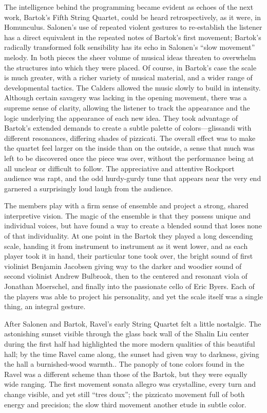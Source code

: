 The intelligence behind the programming became evident as echoes of the next work, Bartok’s Fifth String Quartet, could be heard retrospectively, as it were, in Homunculus. Salonen’s use of repeated violent gestures to re-establish the listener has a direct equivalent in the repeated notes of Bartok’s first movement; Bartok’s radically transformed folk sensibility has its echo in Salonen’s “slow movement” melody. In both pieces the sheer volume of musical ideas threaten to overwhelm the structures into which they were placed. Of course, in Bartok’s case the scale is much greater, with a richer variety of musical material, and a wider range of developmental tactics. The Calders allowed the music slowly to build in intensity. Although certain savagery was lacking in the opening movement, there was a supreme sense of clarity, allowing the listener to track the appearance and the logic underlying the appearance of each new idea. They took advantage of Bartok’s extended demands to create a subtle palette of colors—glissandi with different resonances, differing shades of pizzicati. The overall effect was to make the quartet feel larger on the inside than on the outside, a sense that much was left to be discovered once the piece was over, without the performance being at all unclear or difficult to follow. The appreciative and attentive Rockport audience was rapt, and the odd hurdy-gurdy tune that appears near the very end garnered a surprisingly loud laugh from the audience.

The members play with a firm sense of ensemble and project a strong, shared interpretive vision. The magic of the ensemble is that they possess unique and individual voices, but have found a way to create a blended sound that loses none of that individuality. At one point in the Bartok they played a long descending scale, handing it from instrument to instrument as it went lower, and as each player took it in hand, their particular tone took over, the bright sound of first violinist Benjamin Jacobsen giving way to the darker and woodier sound of second violinist Andrew Bulbrook, then to the centered and resonant viola of Jonathan Moerschel, and finally into the passionate cello of Eric Byers. Each of the players was able to project his personality, and yet the scale itself was a single thing, an integral gesture.

After Salonen and Bartok, Ravel’s early String Quartet felt a little nostalgic. The astonishing sunset visible through the glass back wall of the Shalin Liu center during the first half had highlighted the more modern qualities of this beautiful hall; by the time Ravel came along, the sunset had given way to darkness, giving the hall a burnished-wood warmth.. The panoply of tone colors found in the Ravel was a different scheme than those of the Bartok, but they were equally wide ranging. The first movement sonata allegro was crystalline, every turn and change visible, and yet still “tres doux”; the pizzicato movement full of both energy and precision; the slow third movement another etude in subtle color.

